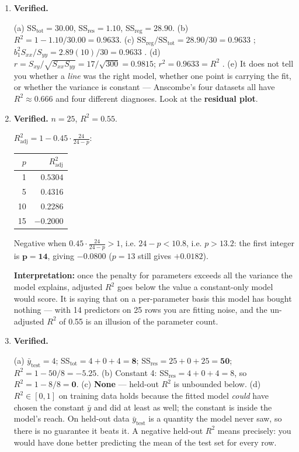 \documentclass[11pt,a4paper]{article}
\newcommand{\A}[1]{\item[\textbf{#1}]}
\begin{document}
\begin{enumerate}[leftmargin=1.9cm]
\A{U5.54} \textbf{Verified.}
\begin{answerbox}
(a) SS$_{\text{tot}} = \mathbf{30.00}$, SS$_{\text{res}} = \mathbf{1.10}$,
SS$_{\text{reg}} = \mathbf{28.90}$.
(b) $R^2 = 1 - 1.10/30.00 = \mathbf{0.9633}$.
(c) $\text{SS}_{\text{reg}}/\text{SS}_{\text{tot}} = 28.90/30 = 0.9633$
\checkmark; $b_1^2S_{xx}/S_{yy} = 2.89(10)/30 = 0.9633$ \checkmark.
(d) $r = S_{xy}/\sqrt{S_{xx}S_{yy}} = 17/\sqrt{300} = \mathbf{0.9815}$;
$r^2 = 0.9633 = R^2$ \checkmark.
(e) It does not tell you whether a \emph{line} was the right model, whether one
point is carrying the fit, or whether the variance is constant --- Anscombe's
four datasets all have $R^2 \approx 0.666$ and four different diagnoses. Look
at the \textbf{residual plot}.
\end{answerbox}

\A{U5.55} \textbf{Verified.} $n = 25$, $R^2 = 0.55$.
\begin{answerbox}
$R^2_{\text{adj}} = 1 - 0.45\cdot\frac{24}{24-p}$:
\begin{center}\begin{tabular}{@{}rr@{}}\toprule
$p$ & $R^2_{\text{adj}}$\\
\midrule
1 & $\mathbf{0.5304}$\\ 5 & 0.4316\\ 10 & 0.2286\\ 15 & $-0.2000$\\
\bottomrule\end{tabular}\end{center}
Negative when $0.45\cdot\frac{24}{24-p} > 1$, i.e. $24 - p < 10.8$, i.e.
$p > 13.2$: the first integer is $\mathbf{p = 14}$, giving $-0.0800$
($p = 13$ still gives $+0.0182$).

\textbf{Interpretation:} once the penalty for parameters exceeds all the
variance the model explains, adjusted $R^2$ goes below the value a
constant-only model would score. It is saying that on a per-parameter basis
this model has bought nothing --- with 14 predictors on 25 rows you are fitting
noise, and the un-adjusted $R^2$ of 0.55 is an illusion of the parameter count.
\end{answerbox}

\A{U5.56} \textbf{Verified.}
\begin{answerbox}
(a) $\bar y_{\text{test}} = 4$; SS$_{\text{tot}} = 4+0+4 = \mathbf{8}$;
SS$_{\text{res}} = 25+0+25 = \mathbf{50}$;
$R^2 = 1 - 50/8 = \mathbf{-5.25}$.
(b) Constant 4: SS$_{\text{res}} = 4+0+4 = 8$, so $R^2 = 1 - 8/8 = \mathbf{0}$.
(c) \textbf{None} --- held-out $R^2$ is unbounded below.
(d) $R^2 \in [0,1]$ on training data holds because the fitted model
\emph{could} have chosen the constant $\bar y$ and did at least as well; the
constant is inside the model's reach. On held-out data $\bar y_{\text{test}}$
is a quantity the model never saw, so there is no guarantee it beats it. A
negative held-out $R^2$ means precisely: you would have done better predicting
the mean of the test set for every row.
\end{answerbox}


\end{enumerate}
\end{document}
